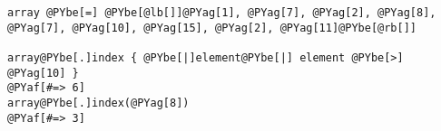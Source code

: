 \begin{Verbatim}[commandchars=@\[\]]
array @PYbe[=] @PYbe[@lb[]]@PYag[1], @PYag[7], @PYag[2], @PYag[8], @PYag[7], @PYag[10], @PYag[15], @PYag[2], @PYag[11]@PYbe[@rb[]]

array@PYbe[.]index { @PYbe[|]element@PYbe[|] element @PYbe[>] @PYag[10] }
@PYaf[#=> 6]
array@PYbe[.]index(@PYag[8])
@PYaf[#=> 3]
\end{Verbatim}
